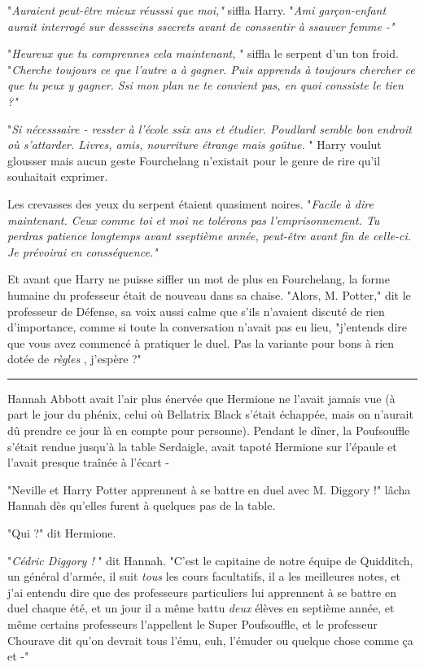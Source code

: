"\emph{Auraient peut-être mieux réusssi que moi,"}  siffla Harry. "\emph{Ami garçon-enfant aurait interrogé sur dessseins ssecrets avant de conssentir à ssauver femme -"} 

"\emph{Heureux que tu comprennes cela maintenant,} " siffla le serpent d'un ton froid. "\emph{Cherche toujours ce que l'autre a à gagner. Puis apprends à toujours chercher ce que tu peux y gagner. Ssi mon plan ne te convient pas, en quoi conssiste le tien ?"} 

"\emph{Si nécesssaire - resster à l'école ssix ans et étudier. Poudlard semble bon endroit où s'attarder. Livres, amis, nourriture étrange mais goûtue.} " Harry voulut glousser mais aucun geste Fourchelang n'existait pour le genre de rire qu'il souhaitait exprimer.

Les crevasses des yeux du serpent étaient quasiment noires. "\emph{Facile à dire maintenant. Ceux comme toi et moi ne tolérons pas l'emprisonnement. Tu perdras patience longtemps avant sseptième année, peut-être avant fin de celle-ci. Je prévoirai en consséquence."} 

Et avant que Harry ne puisse siffler un mot de plus en Fourchelang, la forme humaine du professeur était de nouveau dans sa chaise. "Alors, M. Potter," dit le professeur de Défense, sa voix aussi calme que s'ils n'avaient discuté de rien d'importance, comme si toute la conversation n'avait pas eu lieu, "j'entends dire que vous avez commencé à pratiquer le duel. Pas la variante pour bons à rien dotée de \emph{règles} , j'espère ?"
\par\noindent\rule{\textwidth}{0.4pt}
Hannah Abbott avait l'air plus énervée que Hermione ne l'avait jamais vue (à part le jour du phénix, celui où Bellatrix Black s'était échappée, mais on n'aurait dû prendre ce jour là en compte pour personne). Pendant le dîner, la Poufsouffle s'était rendue jusqu'à la table Serdaigle, avait tapoté Hermione sur l'épaule et l'avait presque traînée à l'écart -

"Neville et Harry Potter apprennent à se battre en duel avec M. Diggory !" lâcha Hannah dès qu'elles furent à quelques pas de la table.

"Qui ?" dit Hermione.

"\emph{Cédric Diggory !} " dit Hannah. "C'est le capitaine de notre équipe de Quidditch, un général d'armée, il suit \emph{tous}  les cours facultatifs, il a les meilleures notes, et j'ai entendu dire que des professeurs particuliers lui apprennent à se battre en duel chaque été, et un jour il a même battu \emph{deux}  élèves en septième année, et même certains professeurs l'appellent le Super Poufsouffle, et le professeur Chourave dit qu'on devrait tous l'ému, euh, l'émuder ou quelque chose comme ça et -"

